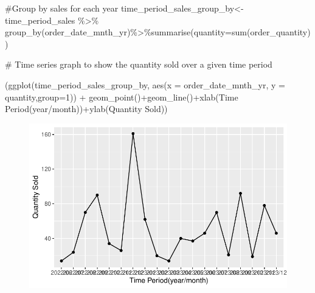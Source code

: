 \documentclass[
  letterpaper,
  DIV=11,
  numbers=noendperiod]{scrartcl}
\newenvironment{Shaded}{\begin{snugshade}}{\end{snugshade}}
\newcommand{\AttributeTok}[1]{\textcolor[rgb]{0.40,0.45,0.13}{#1}}
\newcommand{\CommentTok}[1]{\textcolor[rgb]{0.37,0.37,0.37}{#1}}
\newcommand{\DecValTok}[1]{\textcolor[rgb]{0.68,0.00,0.00}{#1}}
\newcommand{\FunctionTok}[1]{\textcolor[rgb]{0.28,0.35,0.67}{#1}}
\newcommand{\NormalTok}[1]{\textcolor[rgb]{0.00,0.23,0.31}{#1}}
\newcommand{\OtherTok}[1]{\textcolor[rgb]{0.00,0.23,0.31}{#1}}
\newcommand{\SpecialCharTok}[1]{\textcolor[rgb]{0.37,0.37,0.37}{#1}}
\newcommand{\StringTok}[1]{\textcolor[rgb]{0.13,0.47,0.30}{#1}}
\begin{document}
\begin{Shaded}
\begin{Highlighting}[]
\CommentTok{\#Group by sales for each year}
\NormalTok{time\_period\_sales\_group\_by}\OtherTok{\textless{}{-}}\NormalTok{ time\_period\_sales }\SpecialCharTok{\%\textgreater{}\%} \FunctionTok{group\_by}\NormalTok{(order\_date\_mnth\_yr)}\SpecialCharTok{\%\textgreater{}\%}\FunctionTok{summarise}\NormalTok{(}\AttributeTok{quantity=}\FunctionTok{sum}\NormalTok{(order\_quantity))}

\CommentTok{\# Time series graph to show the quantity sold over a given time period}

\NormalTok{(}\FunctionTok{ggplot}\NormalTok{(time\_period\_sales\_group\_by, }\FunctionTok{aes}\NormalTok{(}\AttributeTok{x =}\NormalTok{ order\_date\_mnth\_yr, }\AttributeTok{y =}\NormalTok{ quantity,}\AttributeTok{group=}\DecValTok{1}\NormalTok{)) }\SpecialCharTok{+}  \FunctionTok{geom\_point}\NormalTok{()}\SpecialCharTok{+}\FunctionTok{geom\_line}\NormalTok{()}\SpecialCharTok{+}\FunctionTok{xlab}\NormalTok{(}\StringTok{\textquotesingle{}Time Period(year/month)\textquotesingle{}}\NormalTok{)}\SpecialCharTok{+}\FunctionTok{ylab}\NormalTok{(}\StringTok{\textquotesingle{}Quantity Sold\textquotesingle{}}\NormalTok{))}
\end{Highlighting}
\end{Shaded}

\begin{figure}[H]

{\centering \includegraphics{Report_files/figure-pdf/Report 3-1.pdf}

}

\end{figure}
\end{document}
